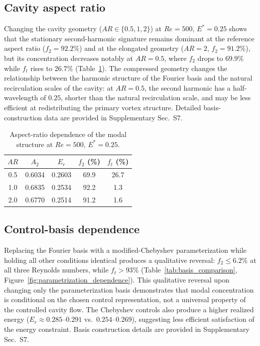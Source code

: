 \documentclass[a4paper,11pt]{article}
\begin{document}
\subsection{Cavity aspect ratio}

Changing the cavity geometry (\(AR\in\{0.5,1,2\}\)) at \(Re=500\), \(E^*=0.25\)
shows that the stationary second-harmonic signature remains dominant at the
reference aspect ratio (\(f_2=92.2\%\)) and at the elongated geometry
(\(AR=2\), \(f_2=91.2\%\)), but its concentration decreases notably at \(AR=0.5\),
where \(f_2\) drops to \(69.9\%\) while \(f_t\) rises to \(26.7\%\)
(Table~\ref{tab:aspect_ratio}). The compressed geometry changes the relationship
between the harmonic structure of the Fourier basis and the natural recirculation
scales of the cavity: at \(AR=0.5\), the second harmonic has a half-wavelength of
\(0.25\), shorter than the natural recirculation scale, and may be less efficient
at redistributing the primary vortex structure. Detailed basis-construction data
are provided in Supplementary Sec.~S7.

\begin{table}[t]
\centering
\caption{Aspect-ratio dependence of the modal structure at \(Re=500\), \(E^*=0.25\).}
\label{tab:aspect_ratio}
\small
\begin{tabular}{ccccc}
\toprule
\(AR\) & \(A_2\) & \(E_r\) & \(f_2\) (\%) & \(f_t\) (\%)\\
\midrule
0.5 & 0.6034 & 0.2603 & 69.9 & 26.7\\
1.0 & 0.6835 & 0.2534 & 92.2 & 1.3\\
2.0 & 0.6770 & 0.2514 & 91.2 & 1.6\\
\bottomrule
\end{tabular}
\end{table}

\subsection{Control-basis dependence}

Replacing the Fourier basis with a modified-Chebyshev parameterization while holding
all other conditions identical produces a qualitative reversal: \(f_2\le6.2\%\)
at all three Reynolds numbers, while \(f_t>93\%\)
(Table~\ref{tab:basis_comparison}, Figure~\ref{fig:parametrization_dependence}).
This qualitative reversal upon changing only the parameterization basis demonstrates
that modal concentration is conditional on the chosen control representation,
not a universal property of the controlled cavity flow. The Chebyshev controls
also produce a higher realized energy (\(E_r\approx0.285\)--\(0.291\) vs.\
\(0.254\)--\(0.269\)), suggesting less efficient satisfaction of the energy constraint.
Basis construction details are provided in Supplementary Sec.~S7.
\end{document}
